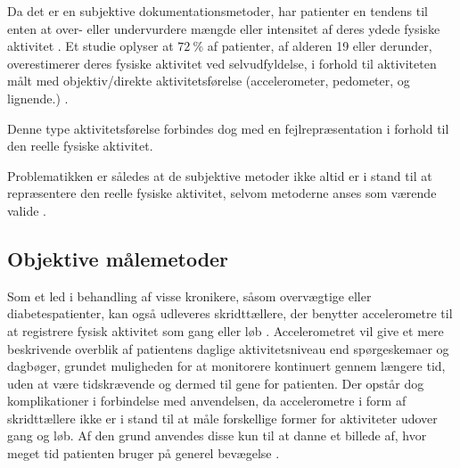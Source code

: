 Da det er en subjektive dokumentationsmetoder, har patienter en tendens til enten at over- eller undervurdere mængde eller intensitet af deres ydede fysiske aktivitet \citep{adamo2009}. 
Et studie oplyser at $72~\%$ af patienter, af alderen 19 eller derunder, overestimerer deres fysiske aktivitet ved selvudfyldelse, i forhold til aktiviteten målt med objektiv/direkte aktivitetsførelse (accelerometer, pedometer, og lignende.) \citep{adamo2009}.

Denne type aktivitetsførelse forbindes dog med en fejlrepræsentation i forhold til den reelle fysiske aktivitet. 

Problematikken er således at de subjektive metoder ikke altid er i stand til at repræsentere den reelle fysiske aktivitet, selvom metoderne anses som værende valide \citep{pedersen2011, motionsraad2007}. 

\subsection{Objektive målemetoder}

Som et led i behandling af visse kronikere, såsom overvægtige eller diabetespatienter, kan også udleveres skridttællere, der benytter accelerometre til at registrere fysisk aktivitet som gang eller løb \citep{muller2009, jensen2012, snorgaard2010}. 
Accelerometret vil give et mere beskrivende overblik af patientens daglige aktivitetsniveau end spørgeskemaer og dagbøger, grundet muligheden for at monitorere kontinuert gennem længere tid, uden at være tidskrævende og dermed til gene for patienten. 
Der opstår dog komplikationer i forbindelse med anvendelsen, da accelerometre i form af skridttællere ikke er i stand til at måle forskellige former for aktiviteter udover gang og løb. 
Af den grund anvendes disse kun til at danne et billede af, hvor meget tid patienten bruger på generel bevægelse  \citep{motionsraad2007}.